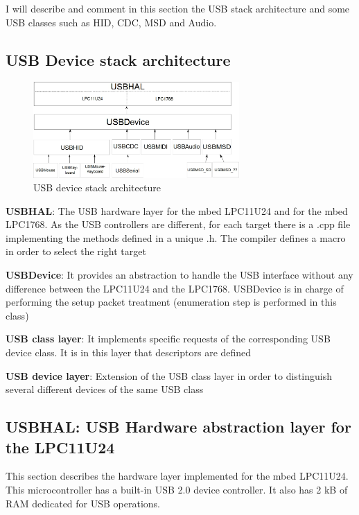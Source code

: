 \documentclass[pdftex,10pt,a4paper]{report}
\newenvironment{packed_item}{
\begin{itemize}
  \setlength{\itemsep}{1pt}
  \setlength{\parskip}{0pt}
  \setlength{\parsep}{0pt}
}{\end{itemize}}
\begin{document}
I will describe and comment in this section the USB stack architecture and some USB classes such as HID, CDC, MSD and Audio.


\subsection{USB Device stack architecture}
\begin{figure}[h!]
		\centering
		\includegraphics[width=0.7\textwidth]{./usb_arch3.jpg}
		\caption{USB device stack architecture}
		\label{USB device stack architecture}
\end{figure}

\begin{packed_item}

	\item \textbf{USBHAL}: The USB hardware layer for the mbed LPC11U24 and for the mbed LPC1768. As the USB controllers are different, for each target there is a .cpp file implementing the methods defined in a unique .h. The compiler defines a macro in order to select the right target

	\item \textbf{USBDevice}: It provides an abstraction to handle the USB interface without any difference between the LPC11U24 and the LPC1768. USBDevice is in charge of performing the setup packet treatment (enumeration step is performed in this class)

	\item \textbf{USB class layer}: It implements specific requests of the corresponding USB device class. It is in this layer that descriptors are defined
		
	\item \textbf{USB device layer}: Extension of the USB class layer in order to distinguish several different devices of the same USB class
	
\end{packed_item}


\subsection{USBHAL: USB Hardware abstraction layer for the LPC11U24}
This section describes the hardware layer implemented for the mbed LPC11U24. This microcontroller has a built-in USB 2.0 device controller. It also has 2 kB of RAM dedicated for USB operations.
\end{document}
